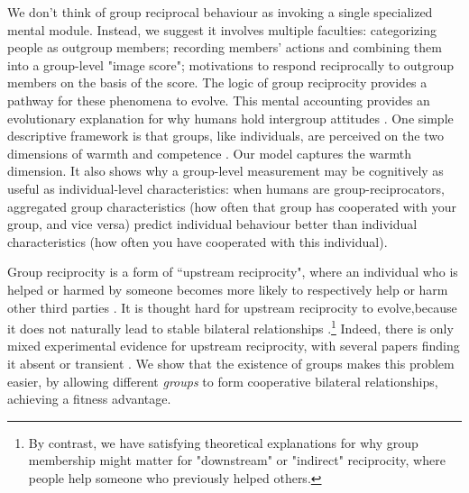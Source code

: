 \documentclass[12pt,a4paper]{article}
\begin{document}
We don't think of group reciprocal behaviour as invoking a single specialized 
mental module. Instead, we suggest it involves multiple faculties: categorizing 
people as outgroup members; recording members' actions and combining them into a 
group-level "image score"; motivations to respond reciprocally to outgroup 
members on the basis of the score. The logic of group reciprocity provides a 
pathway for these phenomena to evolve.  This mental
accounting provides an evolutionary explanation for why humans hold intergroup 
attitudes \parencite{brewer1985psychology,kurzban2001can}. One simple descriptive 
framework is that groups, like individuals, are perceived on the two dimensions of
warmth and competence \parencite{fiske2007universal}. Our model captures
the warmth dimension. It also shows why a group-level measurement may be cognitively
as useful as individual-level characteristics: when humans are group-reciprocators,
aggregated group characteristics (how often that group has cooperated
with your group, and vice versa) predict individual behaviour better than individual
characteristics (how often you have cooperated with this individual).

Group reciprocity is a form of ``upstream reciprocity", where an individual who is helped or harmed by someone becomes more likely to respectively help or harm other third parties \parencite{boyd1989evolution}. It is thought hard for upstream reciprocity to evolve,because it does not naturally lead to stable bilateral relationships \parencite{nowak2007upstream}.\footnote{By contrast, we have satisfying theoretical explanations for why group membership might matter for "downstream" or "indirect" reciprocity, where people help someone who previously helped others.} Indeed, there is only mixed experimental evidence for upstream reciprocity, with several papers finding it absent or transient \parencite{ben2004reciprocity,stanca2009measuring,van2016indirect,horita2016transient,greiner2005indirect}. We show that the existence of groups makes this problem easier, by allowing different \emph{groups} to form cooperative bilateral relationships, achieving a fitness advantage. 
\end{document}
